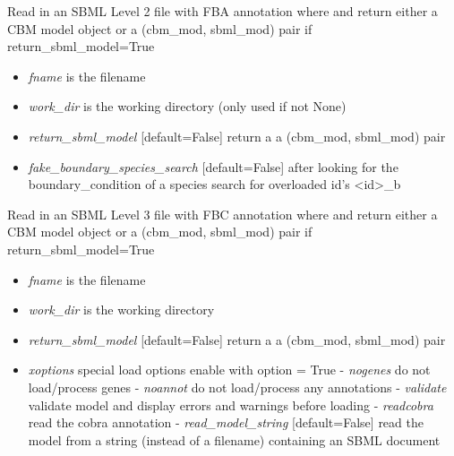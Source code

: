 \documentclass[a4paper,11pt,english]{sphinxmanual}
\begin{document}

\begin{fulllineitems}
\label{modules_doc:cbmpy.CBXML.sbml_readSBML2FBA}
Read in an SBML Level 2 file with FBA annotation where and return either a CBM model object
or a (cbm\_mod, sbml\_mod) pair if return\_sbml\_model=True
\begin{itemize}
\item {} 
\emph{fname} is the filename

\item {} 
\emph{work\_dir} is the working directory (only used if not None)

\item {} 
\emph{return\_sbml\_model} {[}default=False{]} return a a (cbm\_mod, sbml\_mod) pair

\item {} 
\emph{fake\_boundary\_species\_search} {[}default=False{]} after looking for the boundary\_condition of a species search for overloaded id's \textless{}id\textgreater{}\_b

\end{itemize}

\end{fulllineitems}


\begin{fulllineitems}
\label{modules_doc:cbmpy.CBXML.sbml_readSBML3FBC}
Read in an SBML Level 3 file with FBC annotation where and return either a CBM model object
or a (cbm\_mod, sbml\_mod) pair if return\_sbml\_model=True
\begin{itemize}
\item {} 
\emph{fname} is the filename

\item {} 
\emph{work\_dir} is the working directory

\item {} 
\emph{return\_sbml\_model} {[}default=False{]} return a a (cbm\_mod, sbml\_mod) pair

\item {} 
\emph{xoptions} special load options enable with option = True
- \emph{nogenes} do not load/process genes
- \emph{noannot} do not load/process any annotations
- \emph{validate} validate model and display errors and warnings before loading
- \emph{readcobra} read the cobra annotation
- \emph{read\_model\_string} {[}default=False{]} read the model from a string (instead of a filename) containing an SBML document

\end{itemize}

\end{fulllineitems}
\end{document}
